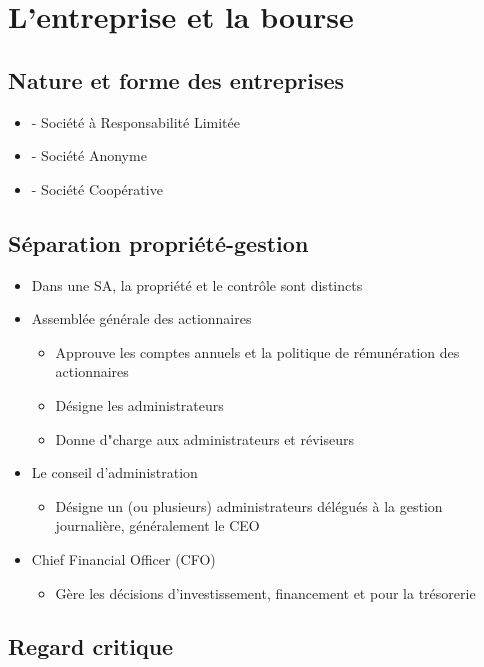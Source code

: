 \chapter{L'entreprise et la bourse}

\section{Nature et forme des entreprises}

\begin{itemize}
    \item {} - Société à Responsabilité Limitée
    \item {} - Société Anonyme
    \item {} - Société Coopérative
\end{itemize}

\section{Séparation propriété-gestion}

\begin{itemize}
    \item Dans une SA, la propriété et le contrôle sont distincts
    \item Assemblée générale des actionnaires
    \begin{itemize}
        \item Approuve les comptes annuels et la politique de rémunération des actionnaires
        \item Désigne les administrateurs
        \item Donne d"charge aux administrateurs et réviseurs
    \end{itemize}
    \item Le conseil d'administration
    \begin{itemize}
        \item Désigne un (ou plusieurs) administrateurs délégués à la gestion journalière, généralement le CEO
    \end{itemize}
    \item Chief Financial Officer (CFO)
    \begin{itemize}
        \item Gère les décisions d'investissement, financement et pour la trésorerie
    \end{itemize}
\end{itemize}

\section{Regard critique}

